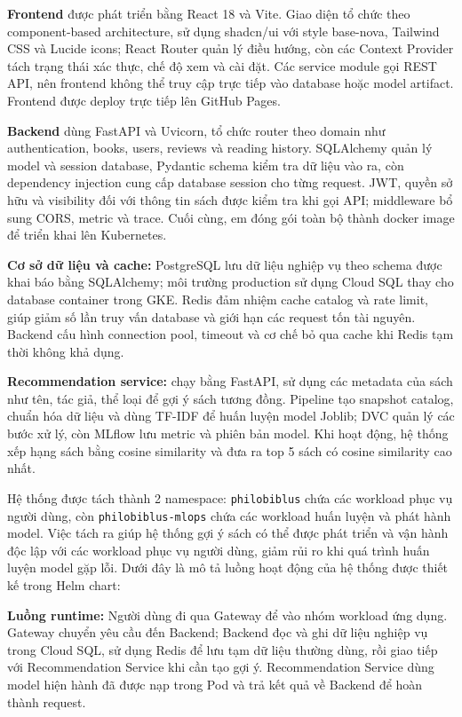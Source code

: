 
\textbf{Frontend} được phát triển bằng React 18 và Vite. Giao diện tổ chức theo component-based architecture, sử dụng shadcn/ui với style base-nova, Tailwind CSS và Lucide icons; React Router quản lý điều hướng, còn các Context Provider tách trạng thái xác thực, chế độ xem và cài đặt. Các service module gọi REST API, nên frontend không thể truy cập trực tiếp vào database hoặc model artifact. Frontend được deploy trực tiếp lên GitHub Pages.

\textbf{Backend} dùng FastAPI và Uvicorn, tổ chức router theo domain như authentication, books, users, reviews và reading history. SQLAlchemy quản lý model và session database, Pydantic schema kiểm tra dữ liệu vào ra, còn dependency injection cung cấp database session cho từng request. JWT, quyền sở hữu và visibility đối với thông tin sách được kiểm tra khi gọi API; middleware bổ sung CORS, metric và trace. Cuối cùng, em đóng gói toàn bộ thành docker image để triển khai lên Kubernetes.

\textbf{Cơ sở dữ liệu và cache:} PostgreSQL lưu dữ liệu nghiệp vụ theo schema được khai báo bằng SQLAlchemy; môi trường production sử dụng Cloud SQL thay cho database container trong GKE. Redis đảm nhiệm cache catalog và rate limit, giúp giảm số lần truy vấn database và giới hạn các request tốn tài nguyên. Backend cấu hình connection pool, timeout và cơ chế bỏ qua cache khi Redis tạm thời không khả dụng.

\textbf{Recommendation service:} chạy bằng FastAPI, sử dụng các metadata của sách như tên, tác giả, thể loại để gợi ý sách tương đồng. Pipeline tạo snapshot catalog, chuẩn hóa dữ liệu và dùng TF-IDF để huấn luyện model Joblib; DVC quản lý các bước xử lý, còn MLflow lưu metric và phiên bản model. Khi hoạt động, hệ thống xếp hạng sách bằng cosine similarity và đưa ra top 5 sách có cosine similarity cao nhất.

Hệ thống được tách thành 2 namespace: \texttt{philobiblus} chứa các workload phục vụ người dùng, còn \texttt{philobiblus-mlops} chứa các workload huấn luyện và phát hành model. Việc tách ra giúp hệ thống gợi ý sách có thể được phát triển và vận hành độc lập với các workload phục vụ người dùng, giảm rủi ro khi quá trình huấn luyện model gặp lỗi. Dưới đây là mô tả luồng hoạt động của hệ thống được thiết kế trong Helm chart:

\textbf{Luồng runtime:} Người dùng đi qua Gateway để vào nhóm workload ứng dụng. Gateway chuyển yêu cầu đến Backend; Backend đọc và ghi dữ liệu nghiệp vụ trong Cloud SQL, sử dụng Redis để lưu tạm dữ liệu thường dùng, rồi giao tiếp với Recommendation Service khi cần tạo gợi ý. Recommendation Service dùng model hiện hành đã được nạp trong Pod và trả kết quả về Backend để hoàn thành request.

